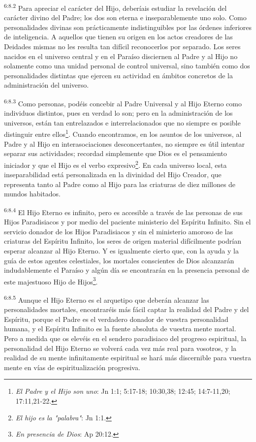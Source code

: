 \par
\textsuperscript{6:8.2} Para apreciar el carácter del Hijo, deberíais estudiar la revelación del carácter divino del Padre; los dos son eterna e inseparablemente uno solo. Como personalidades divinas son prácticamente indistinguibles por las órdenes inferiores de inteligencia. A aquellos que tienen su origen en los actos creadores de las Deidades mismas no les resulta tan difícil reconocerlos por separado. Los seres nacidos en el universo central y en el Paraíso disciernen al Padre y al Hijo no solamente como una unidad personal de control universal, sino también como dos personalidades distintas que ejercen su actividad en ámbitos concretos de la administración del universo.

\par
\textsuperscript{6:8.3} Como personas, podéis concebir al Padre Universal y al Hijo Eterno como individuos distintos, pues en verdad lo son; pero en la administración de los universos, están tan entrelazados e interrelacionados que no siempre es posible distinguir entre ellos\footnote{\textit{El Padre y el Hijo son uno}: Jn 1:1; 5:17-18; 10:30,38; 12:45; 14:7-11,20; 17:11,21-22.}. Cuando encontramos, en los asuntos de los universos, al Padre y al Hijo en interasociaciones desconcertantes, no siempre es útil intentar separar sus actividades; recordad simplemente que Dios es el pensamiento iniciador y que el Hijo es el verbo expresivo\footnote{\textit{El hijo es la "palabra"}: Jn 1:1.}. En cada universo local, esta inseparabilidad está personalizada en la divinidad del Hijo Creador, que representa tanto al Padre como al Hijo para las criaturas de diez millones de mundos habitados.

\par
\textsuperscript{6:8.4} El Hijo Eterno es infinito, pero es accesible a través de las personas de sus Hijos Paradisiacos y por medio del paciente ministerio del Espíritu Infinito. Sin el servicio donador de los Hijos Paradisiacos y sin el ministerio amoroso de las criaturas del Espíritu Infinito, los seres de origen material difícilmente podrían esperar alcanzar al Hijo Eterno. Y es igualmente cierto que, con la ayuda y la guía de estos agentes celestiales, los mortales conscientes de Dios alcanzarán indudablemente el Paraíso y algún día se encontrarán en la presencia personal de este majestuoso Hijo de Hijos\footnote{\textit{En presencia de Dios}: Ap 20:12.}.

\par
\textsuperscript{6:8.5} Aunque el Hijo Eterno es el arquetipo que deberán alcanzar las personalidades mortales, encontraréis más fácil captar la realidad del Padre y del Espíritu, porque el Padre es el verdadero donador de vuestra personalidad humana, y el Espíritu Infinito es la fuente absoluta de vuestra mente mortal. Pero a medida que os elevéis en el sendero paradisiaco del progreso espiritual, la personalidad del Hijo Eterno se volverá cada vez más real para vosotros, y la realidad de su mente infinitamente espiritual se hará más discernible para vuestra mente en vías de espiritualización progresiva.

